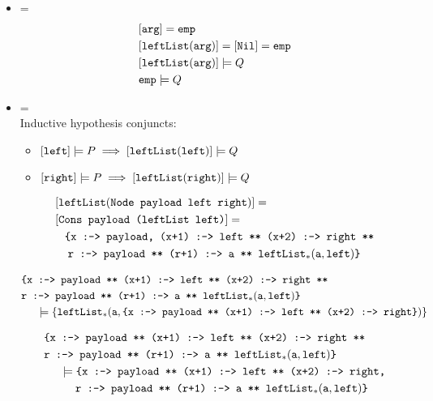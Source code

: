 \documentclass[10pt]{article}
\begin{document}
\begin{itemize}
  \item {} = \\
    \begin{align*}
      &[\texttt{arg}] = \texttt{emp}\\
      &[\texttt{leftList}(\texttt{arg})] = [\texttt{Nil}] = \texttt{emp}\\
      &[\texttt{leftList}(\texttt{arg})] \models Q\\
      &\texttt{emp} \models Q
    \end{align*}

  \item {} = \\
    Inductive hypothesis conjuncts:
      \begin{itemize}
        \item $[\texttt{left}] \models P \implies [\texttt{leftList}(\texttt{left})] \models Q$
        \item $[\texttt{right}] \models P \implies [\texttt{leftList}(\texttt{right})] \models Q$
      \end{itemize}

    \begin{align*}
      &[\texttt{leftList}(\texttt{Node payload left right})] =\\
      &[\texttt{Cons payload (leftList left)}] =\\
        &\;\;\;\texttt{\{x :-> payload, (x+1) :-> left ** (x+2) :-> right **}\\
        &\;\;\;\;\texttt{r :-> payload ** (r+1) :-> a ** }\texttt{leftList}_{*}(\texttt{a}, \texttt{left})\texttt{\}}
    \end{align*}

    \begin{align*}
        &\texttt{\{x :-> payload ** (x+1) :-> left ** (x+2) :-> right **}\\
        &\texttt{r :-> payload ** (r+1) :-> a ** }\texttt{leftList}_{*}(\texttt{a}, \texttt{left})\texttt{\}}\\
        &\;\;\;\;\;\models \{\texttt{leftList}_{*}(\texttt{a}, \texttt{\{x :-> payload ** (x+1) :-> left ** (x+2) :-> right\}})\}
    \end{align*}

    \begin{align*}
        &\texttt{\{x :-> payload ** (x+1) :-> left ** (x+2) :-> right **}\\
        &\texttt{r :-> payload ** (r+1) :-> a ** }\texttt{leftList}_{*}(\texttt{a}, \texttt{left})\texttt{\}}\\
        &\;\;\;\;\;\models \texttt{\{x :-> payload ** (x+1) :-> left ** (x+2) :-> right,}\\
        &\;\;\;\;\;\;\;\;\;\;\texttt{r :-> payload ** (r+1) :-> a ** }\texttt{leftList}_{*}(\texttt{a}, \texttt{left})\texttt{\}}\\
    \end{align*}
\end{itemize}
\end{document}
